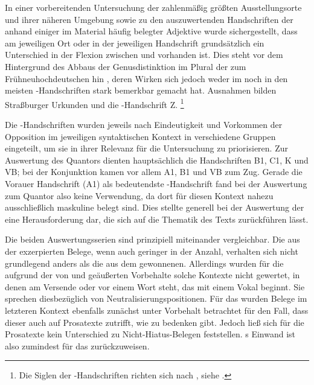 In einer vorbereitenden Untersuchung der zahlenmäßig größten Ausstellungs\-orte
und ihrer näheren Umgebung sowie zu den auszuwertenden Handschriften der
\KC{} anhand einiger im Material häufig belegter Adjektive wurde
sichergestellt, dass am jeweiligen Ort oder in der jeweiligen Handschrift
grundsätzlich ein Unterschied in der Flexion zwischen  und
 vorhanden ist. Dies steht vor dem Hintergrund des Abbaus der
Genusdistinktion im Plural der  zum
Frühneuhochdeutschen hin
\autocite[191--192]{reichmannwegera1993}, deren Wirken sich jedoch weder im
\CAO{} noch in den meisten \KC-Handschriften stark bemerkbar gemacht hat.
Ausnahmen bilden Straßburger Urkunden und die \KC{}-Handschrift Z.%
%
	\footnote{Die Siglen der \KC-Handschriften richten sich nach
		, siehe .}

Die \KC{}-Handschriften wurden jeweils nach Eindeutigkeit und Vorkommen der
Opposition im jeweiligen syntaktischen Kontext in verschiedene Gruppen
eingeteilt, um sie in ihrer Relevanz für die Untersuchung zu priorisieren. Zur
Auswertung des Quantors  dienten hauptsächlich die Handschriften
B1, C1, K und VB; bei der Konjunktion  kamen vor allem A1, B1 und
VB zum Zug. Gerade die Vorauer Handschrift (A1) als bedeutendste
\KC{}-Handschrift fand bei der Auswertung zum Quantor  also keine
Verwendung, da dort für diesen Kontext nahezu ausschließlich maskuline
 belegt sind. Dies stellte generell bei der Auswertung der
\KC{} eine Herausforderung dar, die sich auf die Thematik des Texts
zurückführen lässt.

Die beiden Auswertungsserien sind prinzipiell miteinander vergleichbar. Die aus
der \KC{} exzerpierten Belege, wenn auch geringer in der Anzahl, verhalten sich
nicht grundlegend anders als die aus dem \CAO{} gewonnenen. Allerdings wurden
für die \KC{} aufgrund der von \citet[89--90]{askedal1973} und
\citet[191]{gjelsten1980} geäußerten Vorbehalte solche Kontexte nicht gewertet,
in denen  am Versende oder vor einem Wort steht, das mit einem
Vokal beginnt. Sie sprechen diesbezüglich von Neutralisierungs\-positionen. Für
das \CAO{} wurden Belege im letzteren Kontext ebenfalls zunächst unter
Vorbehalt betrachtet für den Fall, dass dieser auch auf Prosatexte zutrifft,
wie \citet[92]{askedal1973} zu bedenken gibt. Jedoch ließ sich für die
Prosatexte kein Unterschied zu Nicht-\allowbreak{}Hiatus-\allowbreak{}Belegen
feststellen. \citeauthor{askedal1973}s Einwand ist also zumindest für das
\CAO{} zurückzuweisen.

